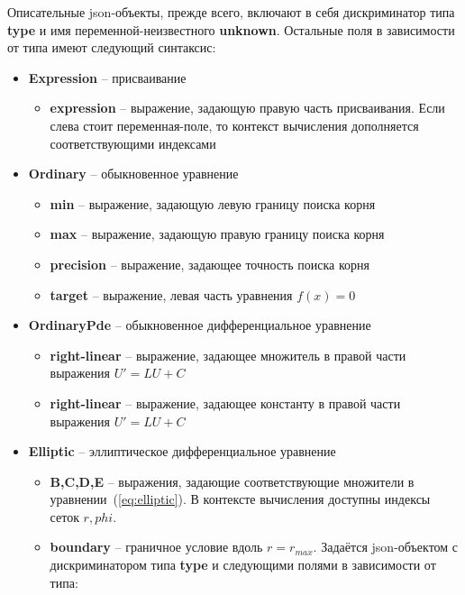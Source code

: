 Описательные json-объекты, прежде всего, включают в себя дискриминатор типа 
\textbf{type} и имя переменной-неизвестного \textbf{unknown}. 
Остальные поля в зависимости от типа имеют следующий синтаксис:
\begin{itemize}
    \item \textbf{Expression} -- присваивание
    \begin{itemize}
        \item \textbf{expression} -- выражение, задающую правую часть 
        присваивания. Если слева стоит переменная-поле, то контекст вычисления 
        дополняется соответствующими индексами
    \end{itemize}
    \item \textbf{Ordinary} -- обыкновенное уравнение
    \begin{itemize}
        \item \textbf{min} -- выражение, задающую левую границу поиска корня
        \item \textbf{max} -- выражение, задающую правую границу поиска корня
        \item \textbf{precision} -- выражение, задающее точность поиска корня
        \item \textbf{target} -- выражение, левая часть уравнения $f(x) = 0$
    \end{itemize}
    \item \textbf{OrdinaryPde} -- обыкновенное дифференциальное уравнение
    \begin{itemize}
        \item \textbf{right-linear} -- выражение, задающее множитель в правой 
        части выражения $U' = LU+C$
        \item \textbf{right-linear} -- выражение, задающее константу в правой 
        части выражения $U' = LU+C$
    \end{itemize}
    \item \textbf{Elliptic} -- эллиптическое дифференциальное уравнение
    \begin{itemize}
        \item \textbf{B,C,D,E} -- выражения, задающие соответствующие множители 
        в уравнении~(\ref{eq:elliptic}). В контексте вычисления доступны 
        индексы сеток $r, phi$.
        \item \textbf{boundary} -- граничное условие вдоль $r=r_{max}$. 
        Задаётся json-объектом с дискриминатором типа \textbf{type} и 
        следующими полями в зависимости от типа:
        \begin{itemize}

\end{itemize}
\end{itemize}
\end{itemize}

